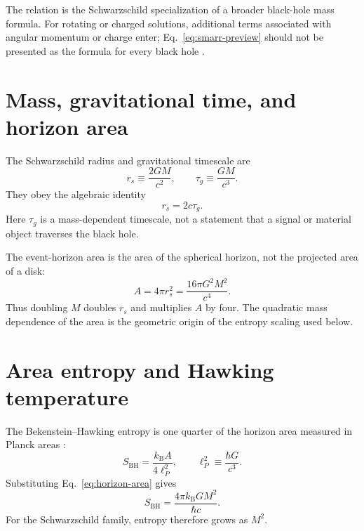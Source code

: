\documentclass[12pt]{article}
\begin{document}
The relation is the Schwarzschild specialization of a broader black-hole mass formula. For rotating or charged solutions, additional terms associated with angular momentum or charge enter; Eq.~\eqref{eq:smarr-preview} should not be presented as the formula for every black hole \cite{BardeenCarterHawking,Smarr}.

\section{Mass, gravitational time, and horizon area}

The Schwarzschild radius and gravitational timescale are
\begin{equation}
  r_s\equiv\frac{2GM}{c^2},
  \qquad
  \tau_g\equiv\frac{GM}{c^3}.
  \label{eq:radius-and-time}
\end{equation}
They obey the algebraic identity
\begin{equation}
  r_s=2c\tau_g.
  \label{eq:radius-time-identity}
\end{equation}
Here $\tau_g$ is a mass-dependent timescale, not a statement that a signal or material object traverses the black hole.

The event-horizon area is the area of the spherical horizon, not the projected area of a disk:
\begin{equation}
  A=4\pi r_s^2
   =\frac{16\pi G^2M^2}{c^4}.
  \label{eq:horizon-area}
\end{equation}
Thus doubling $M$ doubles $r_s$ and multiplies $A$ by four. The quadratic mass dependence of the area is the geometric origin of the entropy scaling used below.

\section{Area entropy and Hawking temperature}

The Bekenstein--Hawking entropy is one quarter of the horizon area measured in Planck areas \cite{Bekenstein,Hawking}:
\begin{equation}
  S_{\mathrm{BH}}=\frac{k_{\mathrm B}A}{4\ell_P^2},
  \qquad
  \ell_P^2\equiv\frac{\hbar G}{c^3}.
  \label{eq:area-law}
\end{equation}
Substituting Eq.~\eqref{eq:horizon-area} gives
\begin{equation}
  S_{\mathrm{BH}}
  =\frac{4\pi k_{\mathrm B}GM^2}{\hbar c}.
  \label{eq:entropy-mass}
\end{equation}
For the Schwarzschild family, entropy therefore grows as $M^2$.
\end{document}
